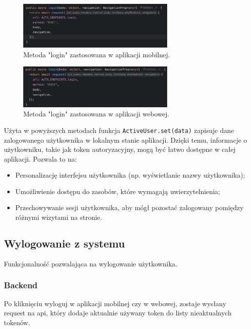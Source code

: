 \begin{figure}[H]
    \centering
    \includegraphics[width=0.7\textwidth]{chapters/chapter_8/screens/logowanie_mobile}
    \caption{Metoda "login" zastosowana w aplikacji mobilnej.}
    \label{img:logowanie_mobile}
\end{figure}

\begin{figure}[H]
    \centering
    \includegraphics[width=0.7\textwidth]{chapters/chapter_8/screens/logowanie_web}
    \caption{Metoda "login" zastosowana w aplikacji webowej.}
    \label{img:logowanie_web}
\end{figure}

Użyta w powyższych metodach funkcja \texttt{ActiveUser.set(data)} zapisuje dane zalogowanego użytkownika w lokalnym stanie aplikacji. Dzięki temu, informacje o użytkowniku, takie jak token autoryzacyjny, mogą być łatwo dostępne w całej aplikacji. Pozwala to na:

\begin{itemize}
    \item Personalizację interfejsu użytkownika (np. wyświetlanie nazwy użytkownika);
    \item Umożliwienie dostępu do zasobów, które wymagają uwierzytelnienia;
    \item Przechowywanie sesji użytkownika, aby mógł pozostać zalogowany pomiędzy różnymi wizytami na stronie.
\end{itemize}

\subsection{Wylogowanie z systemu}
Funkcjonalność pozwalająca na wylogowanie użytkownika.

\subsubsection{Backend}
Po kliknięciu wyloguj w aplikacji mobilnej czy w webowej, zostaje wysłany request na api, który dodaje aktualnie używany token do listy nieaktualnych tokenów.

